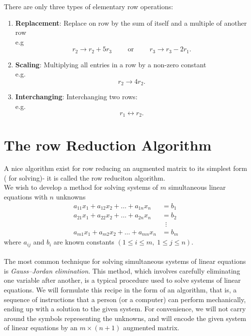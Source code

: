 \documentclass{report}
\begin{document}
  There are only three types of elementary row operations:
  \begin{enumerate}[label=(\arabic*).]  
    \item \textbf{Replacement}: Replace on row by the sum of itself and a multiple of another row\\
      e.g 
      \[
      r_2 \to r_2+5 r_3 \qquad  \text{ or } \qquad  r_3 \to r_3 - 2 r_1
      .\] 
    \item   \textbf{Scaling}: Multiplying all entries in a row by a non-zero constant\\
       e.g. 
       \[
       r_2 \to 4 r_2
       .\] 
     \item \textbf{Interchanging}: Interchanging two rows:\\
       e.g. 
       \[
         r_1 \leftrightarrow      r_2
       .\] 
  \end{enumerate}
  \section{ The row Reduction Algorithm}
  A nice algorithm exist for row reducing an augmented matrix to its simplest form ( for solving)- it is called the row reduciton algorithm.\\

  We wish to develop a method for solving systems of $m$ simultaneous linear
equations with $n$ unknowns
\[
\begin{aligned}
a_{11}x_{1}+a_{12}x_{2}+\dots +a_{1n}x_{n} &= b_{1}\\
a_{21}x_{1}+a_{22}x_{2}+\dots +a_{2n}x_{n} &= b_{2}\\
&\ \;\vdots \\[-2pt]
a_{m1}x_{1}+a_{m2}x_{2}+\dots +a_{mn}x_{n} &= b_{m}
\end{aligned}
\]
where $a_{ij}$ and $b_i$ are known constants $(1\le i\le m,\;1\le j\le n)$.  \\
 \\
The most common technique for solving simultaneous systems of linear
equations is \emph{Gauss–Jordan elimination}. This method, which involves
carefully eliminating one variable after another, is a typical procedure
used to solve systems of linear equations. We will formulate this recipe in
the form of an algorithm, that is, a sequence of instructions that a person
(or a computer) can perform mechanically, ending up with a solution to the
given system. For convenience, we will not carry around the symbols
representing the unknowns, and will encode the given system of linear
equations by an $m\times(n+1)$ augmented matrix.   \\
\end{document}

